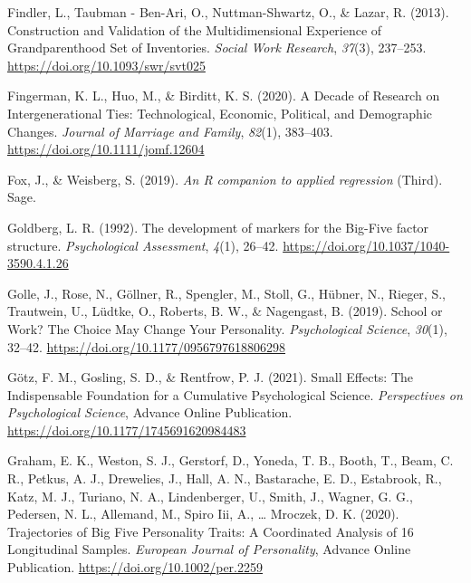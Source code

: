 \documentclass[
  english,
  man, noextraspace]{apa7}
\begin{document}
\leavevmode\hypertarget{ref-findlerConstructionValidationMultidimensional2013}{}%
Findler, L., Taubman - Ben-Ari, O., Nuttman-Shwartz, O., \& Lazar, R. (2013). Construction and Validation of the Multidimensional Experience of Grandparenthood Set of Inventories. \emph{Social Work Research}, \emph{37}(3), 237--253. \url{https://doi.org/10.1093/swr/svt025}

\leavevmode\hypertarget{ref-fingermanDecadeResearchIntergenerational2020}{}%
Fingerman, K. L., Huo, M., \& Birditt, K. S. (2020). A Decade of Research on Intergenerational Ties: Technological, Economic, Political, and Demographic Changes. \emph{Journal of Marriage and Family}, \emph{82}(1), 383--403. \url{https://doi.org/10.1111/jomf.12604}

\leavevmode\hypertarget{ref-car2019}{}%
Fox, J., \& Weisberg, S. (2019). \emph{An R companion to applied regression} (Third). Sage.

\leavevmode\hypertarget{ref-goldbergDevelopmentMarkersBigFive1992}{}%
Goldberg, L. R. (1992). The development of markers for the Big-Five factor structure. \emph{Psychological Assessment}, \emph{4}(1), 26--42. \url{https://doi.org/10.1037/1040-3590.4.1.26}

\leavevmode\hypertarget{ref-golleSchoolWorkChoice2019}{}%
Golle, J., Rose, N., Göllner, R., Spengler, M., Stoll, G., Hübner, N., Rieger, S., Trautwein, U., Lüdtke, O., Roberts, B. W., \& Nagengast, B. (2019). School or Work? The Choice May Change Your Personality. \emph{Psychological Science}, \emph{30}(1), 32--42. \url{https://doi.org/10.1177/0956797618806298}

\leavevmode\hypertarget{ref-gotzSmallEffectsIndispensable2021}{}%
Götz, F. M., Gosling, S. D., \& Rentfrow, P. J. (2021). Small Effects: The Indispensable Foundation for a Cumulative Psychological Science. \emph{Perspectives on Psychological Science}, Advance Online Publication. \url{https://doi.org/10.1177/1745691620984483}

\leavevmode\hypertarget{ref-grahamTrajectoriesBigFive2020}{}%
Graham, E. K., Weston, S. J., Gerstorf, D., Yoneda, T. B., Booth, T., Beam, C. R., Petkus, A. J., Drewelies, J., Hall, A. N., Bastarache, E. D., Estabrook, R., Katz, M. J., Turiano, N. A., Lindenberger, U., Smith, J., Wagner, G. G., Pedersen, N. L., Allemand, M., Spiro Iii, A., \ldots{} Mroczek, D. K. (2020). Trajectories of Big Five Personality Traits: A Coordinated Analysis of 16 Longitudinal Samples. \emph{European Journal of Personality}, Advance Online Publication. \url{https://doi.org/10.1002/per.2259}
\end{document}
